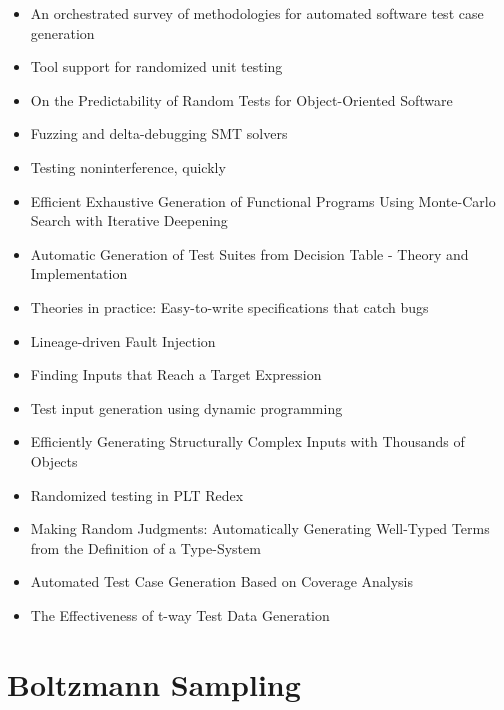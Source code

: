 \begin{itemize}
\item An orchestrated survey of methodologies for automated software test case generation\cite{DBLP:journals/jss/AnandBCCCGHHMOE13}
\item Tool support for randomized unit testing\cite{DBLP:conf/issta/AndrewsHLL06}
\item On the Predictability of Random Tests for Object-Oriented Software\cite{DBLP:conf/icst/CiupaPLOM08}
\item Fuzzing and delta-debugging SMT solvers\cite{brummayer2009fuzzing}
\item Testing noninterference, quickly\cite{DBLP:journals/jfp/HritcuLSADHPV16}
\item Efficient Exhaustive Generation of Functional Programs Using Monte-Carlo Search with Iterative Deepening\cite{DBLP:conf/pricai/Katayama08}
\item Automatic Generation of Test Suites from Decision Table - Theory and Implementation\cite{DBLP:conf/icsea/SharmaB10}
\item Theories in practice: Easy-to-write specifications that catch bugs\cite{saff2008theories}
\item Lineage-driven Fault Injection\cite{DBLP:conf/sigmod/AlvaroRH15}
\item Finding Inputs that Reach a Target Expression\cite{DBLP:conf/scam/NaylorR07}
\item Test input generation using dynamic programming\cite{DBLP:conf/sigsoft/ZaeemK12}
\item Efficiently Generating Structurally Complex Inputs with Thousands of Objects\cite{DBLP:conf/ecoop/ElkarabliehZK07}
\item Randomized testing in PLT Redex\cite{klein2009randomized}
\item Making Random Judgments: Automatically Generating Well-Typed Terms from the Definition of a Type-System\cite{DBLP:conf/esop/FetscherCPHF15}
\item Automated Test Case Generation Based on Coverage Analysis\cite{DBLP:conf/tase/MajchrzakK09}
\item The Effectiveness of t-way Test Data Generation\cite{DBLP:phd/ethos/Ellims09}
\end{itemize}

\section{Boltzmann Sampling}

